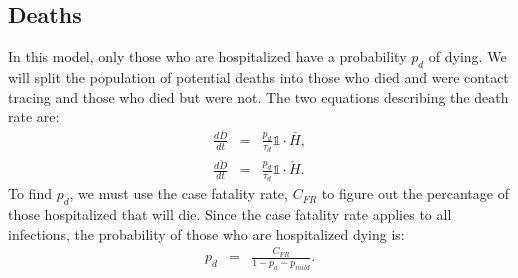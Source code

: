 \documentclass[notitlepage, superscriptaddress]{revtex4-2}
\begin{document}
\subsection{Deaths}
In this model, only those who are hospitalized have a probability $p_{d}$ of dying. We will split the population of potential deaths into those who died and were contact tracing and those who died but were not. The two equations describing the death rate are:
\begin{eqnarray}
\frac{d\bar{D}}{dt} &=& \frac{p_{d}}{\tau_{d}} \mathbb{1} \cdot \bar{H}, \\ 
\frac{d\check{D}}{dt} &=& \frac{p_{d}}{\tau_{d}} \mathbb{1} \cdot \check{H}.
\end{eqnarray}
To find $p_{d}$, we must use the case fatality rate, $C_{FR}$ to figure out the percantage of those hospitalized that will die. Since the case fatality rate applies to all infections, the probability of those who are hospitalized dying is:
\begin{eqnarray}
p_{d} &=& \frac{C_{FR}}{1- p_{a} - p_{mild}}.
\end{eqnarray}
\end{document}
